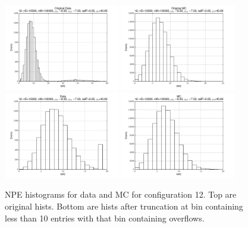  \begin{figure}[htbp] \begin{center} 
\includegraphics[width=0.45\textwidth]{../FIGURES/12/FIG_Original_Data.pdf} 
\includegraphics[width=0.45\textwidth]{../FIGURES/12/FIG_Original_MC.pdf} 
\includegraphics[width=0.45\textwidth]{../FIGURES/12/FIG_Data.pdf} 
\includegraphics[width=0.45\textwidth]{../FIGURES/12/FIG_MC.pdf} 
\caption{NPE histograms for data and MC for configuration 12. Top are original hists. Bottom are hists after truncation at bin containing less than 10 entries with that bin containing overflows.} 
\label{tab:npe_12} 
\end{center} \end{figure} 

 
